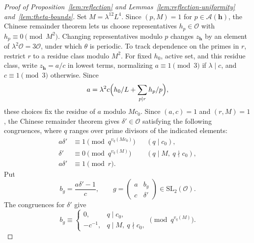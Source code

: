 \documentclass[11pt,a4paper]{article}
\numberwithin{equation}{section}
\numberwithin{figure}{section}
\theoremstyle{definition}
\theoremstyle{remark}
\newcommand{\OO}{\mathcal O}
\begin{document}
\begin{proof}[Proof of Proposition~\ref{lem:reflection} and Lemmas~\ref{lem:reflection-uniformity} and~\ref{lem:theta-bounds}]
Set $M=\lambda^{12}L^4$. Since $(p,M)=1$ for $p\in\mathcal A(\boldsymbol h)$,
the Chinese remainder theorem lets us choose representatives
$h_p\in\OO$ with $h_p\equiv0\pmod{M^2}$. Changing representatives
modulo $p$ changes $z_{\boldsymbol h}$ by an element of $\lambda^2\OO=3\OO$,
under which $\theta$ is periodic.
To track dependence on the primes in $r$, restrict $r$ to a residue
class modulo $M^2$. For fixed $h_0$, active set, and this residue
class, write $z_{\boldsymbol h}=a/c$ in lowest terms,
normalizing \(a\equiv1\pmod3\) if \(\lambda\mid c\), and
\(c\equiv1\pmod3\) otherwise.  Since
\[
 a=\lambda^2c\Bigl(h_0/L+\sum_{p\mid r}h_p/p\Bigr),
\]
these choices fix the residue of $a$ modulo $Mc_0$.
Since $(a,c)=1$ and $(r,M)=1$, the Chinese remainder theorem gives
$\delta'\in\OO$ satisfying the following congruences, where
$q$ ranges over prime divisors of the indicated elements:
\begin{align*}
 a\delta'&\equiv1\pmod{q^{v_q(Mc_0)}}&& (q\mid c_0),\\
 \delta'&\equiv0\pmod{q^{v_q(M)}}&& (q\mid M,\ q\nmid c_0),\\
 a\delta'&\equiv1\pmod r.
\end{align*}
Put
\[
 b_g=\frac{a\delta'-1}{c},
 \qquad g=\begin{pmatrix}a&b_g\\c&\delta'\end{pmatrix}\in\mathrm{SL}_2(\OO).
\]
The congruences for $\delta'$ give
\[
 b_g\equiv
 \begin{cases}
 0,&q\mid c_0,\\
 -c^{-1},&q\mid M,\ q\nmid c_0,
 \end{cases}
 \pmod{q^{v_q(M)}}.
\]


\end{proof}
\end{document}
